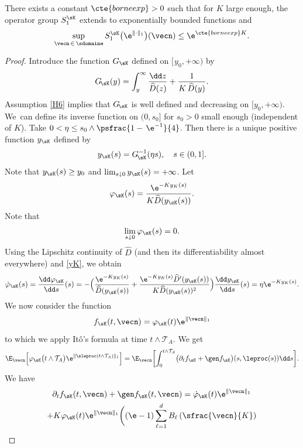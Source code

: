\begin{theorem}\label{borneexp}
There exists a constant $\cte{borneexp}>0$ such that for $K$ large enough, the operator
group $S^{\sK}_{1}$ extends to exponentially bounded functions and
\[
\sup_{\vecn\, \in\, \sdomaine} S^{\sK}_{1}\bigl(\e^{\|\hspace{-0.1pt}\cdot\|_{1}}\bigr)(\vecn)\le
\e^{\cte{borneexp} K}.
\]
\end{theorem}
\begin{proof}
Introduce the function $G_{\sK}$ defined on $[\hspace{1pt}y_{0},+\infty)$ by
\[
G_{\!\sK}(y) = \int_{y}^{\infty}\frac{\dd z}{\widehat{D}(z)}+\frac{1}{K\,\widehat{D}(y)}.
\]
Assumption \eqref{H6} implies that $G_{\!\sK}$ is well defined and decreasing on $[y_{0},+\infty)$. We~can define its
inverse function on $(0,s_{0}]$ for $s_{0}>0$ small enough (independent of $K$).
Take $0<\eta \leq s_{0}\wedge \psfrac{1-\,\e^{-1}}{4}$. Then there is a unique positive function $y_{\sK}$ defined by
\begin{equation}
\label{yK}
y_{\sK}(s)=G_{\!\sK}^{-1}(\eta s),\quad s\in(0,1].
\end{equation}
Note that $y_{\sK}(s)\geq y_{0}$ and $\lim_{s\downarrow 0}y_{\sK}(s)=+\infty$.
Let
\[
\varphi_{\sK}(s)=\frac{\e^{-K y_{K}(s)}}{K \widehat{D}(y_{\sK}(s))}.
\]
Note that
\[
\lim_{s\hspace{.2pt}\downarrow\hspace{.2pt}0}\varphi_{\sK}(s)=0.
\]
Using the Lipschitz continuity of $\widehat{D}$ (and then its differentiability almost everywhere) and \eqref{yK}, we obtain
\[
\dot{\varphi}_{\sK}(s)=\frac{\dd\varphi_{\sK}}{\dd s}(s)=
-\Bigl(\frac{\e^{-K y_{K}(s)}}{\widehat{D}(y_{\sK}(s))}+
\frac{\e^{-K y_{K}(s)} \widehat{D}'(y_{\sK}(s))}{K \widehat{D}(y_{\sK}(s))^{2}}\Bigr)\frac{\dd y_{\sK}}{\dd s}(s)
= \eta \e^{-K y_{K}(s)}.
\]
We now consider the function
\[
f_{\sK}(t,\vecn)=\varphi_{\sK}(t)\e^{\|\vecn\|_{1}}
\]
to which we apply Itô's formula at time $t\wedge \mathcal{T}_A$. We get
\[
\E_{\vecn}\Bigl[\varphi_{\sK}\bigl(t\wedge \mathcal{T}_A\bigr)\e^{\|\sleproc(t\wedge \mathcal{T}_A)\|_{1}}\Bigr]=
\E_{\vecn} \biggl[\int_{0}^{t\wedge \mathcal{T}_A}\bigl(\partial_{t}f_{\sK}+\gen f_{\sK}\bigr)(s,\leproc(s))\dd s \biggr].
\]
We have
\begin{multline*}
\partial_{t}f_{\sK}(t,\vecn)+\gen f_{\sK}(t,\vecn)=
\dot\varphi_{\sK}(t)\e^{\|\vecn\|_{1}}\\
+K \varphi_{\sK}(t)\e^{\|\vecn\|_{1}}\biggl((\e-1)\sum_{\ell=1}^{d}B_{\ell}\left(\sfrac{\vecn}{K}\right)

\end{multline*}
\end{proof}
